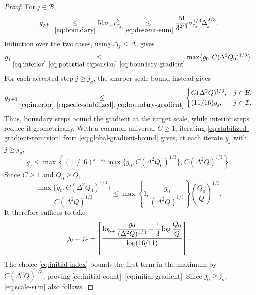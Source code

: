 \begin{proof}
For $j\in\mathcal B$,
\begin{equation}\label{eq:boundary-gradient}
 g_{j+1}\underset{\eqref{eq:boundary}}{\le}51\sigma_{\tau_j}r_{\tau_j}^2
       \underset{\eqref{eq:descent-sum}}{\le}
       \frac{51}{3^{2/3}}\sigma_{\tau_j}^{1/3}\Delta_j^{2/3}.
\end{equation}
Induction over the two cases, using $\Delta_j\le\Delta$, gives
\begin{equation}\label{eq:global-gradient-bound}
 g_j\underset{\eqref{eq:interior},\,\eqref{eq:potential-expansion},\,\eqref{eq:boundary-gradient}}{\le}
       \max\{g_0,C(\Delta^2Q_0)^{1/3}\}.
\end{equation}
For each accepted step $j\ge j_\sigma$, the sharper scale bound instead gives
\begin{equation}\label{eq:stabilized-gradient-recursion}
 g_{j+1}\underset{\eqref{eq:interior},\,\eqref{eq:scale-stabilized},\,\eqref{eq:boundary-gradient}}{\le}
 \begin{cases}
 C(\Delta^2Q)^{1/3},&j\in\mathcal B,\\
 (11/16)g_j,&j\in\mathcal I.
 \end{cases}
\end{equation}
Thus, boundary steps bound the gradient at the target scale, while
interior steps reduce it geometrically.
With a common universal $C\ge1$, iterating
\eqref{eq:stabilized-gradient-recursion} from \eqref{eq:global-gradient-bound}
gives, at each iterate $y_j$ with $j\ge j_\sigma$,
\[
 g_j\le\max\left\{
 (11/16)^{j-j_\sigma}
       \max\{g_0,C(\Delta^2Q_0)^{1/3}\},\,
 C(\Delta^2Q)^{1/3}\right\}.
\]
Since $C\ge1$ and $Q_0\ge Q$,
\[
 \frac{\max\{g_0,C(\Delta^2Q_0)^{1/3}\}}{C(\Delta^2Q)^{1/3}}
 \le\max\left\{1,\frac{g_0}{(\Delta^2Q)^{1/3}}\right\}
       \left(\frac{Q_0}{Q}\right)^{1/3}.
\]
It therefore suffices to take
\begin{equation}\label{eq:initial-index}
 j_0=j_\sigma+
 \left\lceil
 \frac{\displaystyle\log_+\frac{g_0}{(\Delta^2Q)^{1/3}}
             +\frac13\log\frac{Q_0}{Q}}
      {\log(16/11)}
 \right\rceil.
\end{equation}
The choice \eqref{eq:initial-index} bounds the first term in the maximum
by $C(\Delta^2Q)^{1/3}$, proving
\eqref{eq:initial-count}--\eqref{eq:initial-gradient}.
Since $j_0\ge j_\sigma$, \eqref{eq:scale-sum} also follows.
\end{proof}
